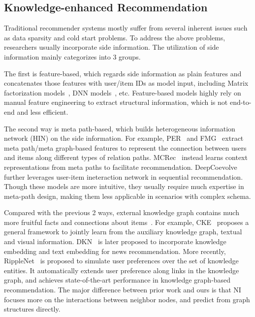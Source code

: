 \documentclass[sigconf]{acmart}
\begin{document}
\subsection{Knowledge-enhanced Recommendation}

Traditional recommender systems 
mostly suffer from several inherent issues such as data sparsity and cold start problems. 
To address the above problems, researchers usually incorporate side information. 
The utilization of side information mainly categorizes into 3 groups.

The first is feature-based, which regards side information as plain features and concatenates those features with user/item IDs as model input, including Matrix factorization models~\cite{koren2008factorization, juan2016field}, DNN models~\cite{qu2016product, guo2017deepfm, qu2018product}, etc. Feature-based models highly rely on manual feature engineering to extract structural information, which is not end-to-end and less efficient. 

The second way is meta path-based, which builds heterogeneous information network (HIN) on the side information. 
For example, PER~\cite{yu2014personalized} and FMG~\cite{zhao2017meta} extract meta path/meta graph-based features to represent the connection between users and items along different types of relation paths.
MCRec~\cite{hu2018leveraging} instead learns context representations from meta paths to facilitate recommendation. 
DeepCoevolve~\cite{dai2016deep} further leverages user-item ineteraction network in sequential recommendation. 
Though these models are more intuitive, they usually require much expertise in meta-path design, making them less applicable in scenarios with complex schema. 

Compared with the previous 2 ways, external knowledge graph contains much more fruitful facts and connections about items~\cite{bollacker2008freebase}.
For example, CKE~\cite{zhang2016collaborative} proposes a general framework to jointly learn from the auxiliary knowledge graph, textual and visual information. 
DKN~\cite{wang2018dkn} is later proposed to incorporate knowledge embedding and text embedding for news recommendation. 
More recently, RippleNet~\cite{wang2018ripplenet} is proposed to simulate user preferences over the set of knowledge entities. It automatically extends user preference along links in the knowledge graph, and achieves state-of-the-art performance in knowledge graph-based recommendation. 
The major difference between prior work and ours is that NI focuses more on the interactions between neighbor nodes, and predict from graph structures directly.
\end{document}
